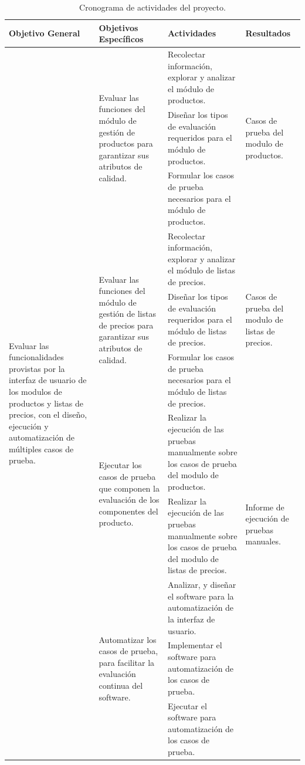 \begin{table}
\centering
\small
{\def\arraystretch{1.75}
\begin{tabular}{|l|l|p{6.5cm}|l|}
\hline
Objetivo General & Objetivos Específicos & Actividades & Resultados \\
\hline
\multirow{11}{4.0cm}{Evaluar las funcionalidades provistas por la interfaz de usuario de los modulos de productos y listas de precios, con el diseño, ejecución y automatización de múltiples casos de prueba.} &
\multirow{3}{4.0cm}{Evaluar las funciones del módulo de gestión de productos para garantizar sus atributos de calidad.} &
Recolectar información, explorar y analizar el módulo de productos. &
\multirow{3}{4.0cm}{Casos de prueba del modulo de productos.} \\
\cline{3-3}
& & Diseñar los tipos de evaluación requeridos para el módulo de productos. & \\
\cline{3-3}
& & Formular los casos de prueba necesarios para el módulo de productos. & \\
\cline{2-4}
& \multirow{3}{4.0cm}{Evaluar las funciones del módulo de gestión de listas de precios para garantizar sus atributos de calidad.} &
Recolectar información, explorar y analizar el módulo de listas de precios. &
\multirow{3}{4.0cm}{Casos de prueba del modulo de listas de precios.} \\
\cline{3-3}
& & Diseñar los tipos de evaluación requeridos para el módulo de listas de precios. & \\
\cline{3-3}
& & Formular los casos de prueba necesarios para el módulo de listas de precios. & \\
\cline{2-4}
& \multirow{2}{4.0cm}{Ejecutar los casos de prueba que componen la evaluación de los componentes del producto.} &
Realizar la ejecución de las pruebas manualmente sobre los casos de prueba del modulo de productos. &
\multirow{3}{4.0cm}{Informe de ejecución de pruebas manuales.} \\
\cline{3-3}
& & Realizar la ejecución de las pruebas manualmente sobre los casos de prueba del modulo de listas de precios. & \\
\cline{2-4}
& \multirow{3}{4.0cm}{Automatizar los casos de prueba, para facilitar la evaluación continua del software.} &
Analizar, y diseñar el software para la automatización de la interfaz de usuario. &
\multirow{3}{4.0cm}{Rutinas de automatización de los casos de prueba.} \\
\cline{3-3}
& & Implementar el software para automatización de los casos de prueba. & \\
\cline{3-3}
& & Ejecutar el software para automatización de los casos de prueba. & \\
\hline
\end{tabular}}
\caption{Cronograma de actividades del proyecto.}
\label{cronograma}
\end{table}

